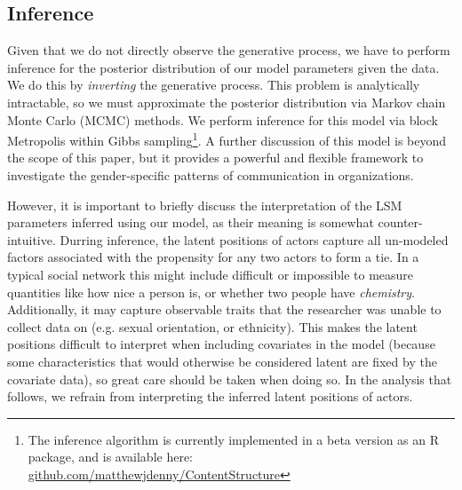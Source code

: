 \documentclass{pnastwo}
\begin{document}
\begin{article}
\subsection{Inference}
Given that we do not directly observe the generative process, we have to perform inference for the posterior distribution of our model parameters given the data. We do this by \emph{inverting} the generative process. This problem is analytically intractable, so we must approximate the posterior distribution via Markov chain Monte Carlo (MCMC) methods. We perform inference for this model via block Metropolis within Gibbs sampling\footnote{The inference algorithm is currently implemented in a beta version as an R package, and is available here: \href{https://github.com/matthewjdenny/ContentStructure}{github.com/matthewjdenny/ContentStructure}}. A further discussion of this model is beyond the scope of this paper, but it provides a powerful and flexible framework to investigate the gender-specific patterns of communication in organizations.

However, it is important to briefly discuss the interpretation of the LSM parameters inferred using our model, as their meaning is somewhat counter-intuitive. Durring inference, the latent positions of actors capture all un-modeled factors associated with the propensity for any two actors to form a tie. In a typical social network this might include difficult or impossible to measure quantities like how nice a person is, or whether two people have \emph{chemistry}. Additionally, it may capture observable traits that the researcher was unable to collect data on (e.g. sexual orientation, or ethnicity). This makes the latent positions difficult to interpret when including covariates in the model (because some characteristics that would otherwise be considered latent are fixed by the covariate data), so great care should be taken when doing so. In the analysis that follows, we refrain from interpreting the inferred latent positions of actors. 


\end{article}
\end{document}
